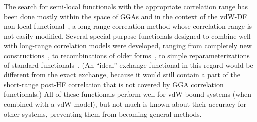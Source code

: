 The search for semi-local functionals with the appropriate correlation range has been done mostly within the space of GGAs and in the context of the vdW-DF non-local functional~\cite{DionPRL04,LeePRB10,MurrayJCTC09}, a long-range correlation method whose correlation range is not easily modified.
Several special-purpose functionals designed to combine well with long-range correlation models were developed, ranging from completely new constructions~\cite{PernalPRL09,WellendorffPRB12}, to recombinations of older forms~\cite{CooperPRB10,HamadaPRB14,BerlandPRB14}, to simple reparameterizations of standard functionals~\cite{ZhangPRL98,KlimesJPCM10,KlimesPRB11}.
(An ``ideal'' exchange functional in this regard would be different from the exact exchange, because it would still contain a part of the short-range post-HF correlation that is not covered by GGA correlation functionals.)
All of these functionals perform well for vdW-bound systems (when combined with a vdW model), but not much is known about their accuracy for other systems, preventing them from becoming general methods.

